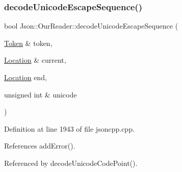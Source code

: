 \subsubsection{\texorpdfstring{decode\+Unicode\+Escape\+Sequence()}{decodeUnicodeEscapeSequence()}}
{\footnotesize\ttfamily bool Json\+::\+Our\+Reader\+::decode\+Unicode\+Escape\+Sequence (\begin{DoxyParamCaption}\item[{\hyperlink{class_json_1_1_our_reader_1_1_token}{Token} \&}]{token,  }\item[{\hyperlink{class_json_1_1_our_reader_a1bdc7bbc52ba87cae6b19746f2ee0189}{Location} \&}]{current,  }\item[{\hyperlink{class_json_1_1_our_reader_a1bdc7bbc52ba87cae6b19746f2ee0189}{Location}}]{end,  }\item[{unsigned int \&}]{unicode }\end{DoxyParamCaption})\hspace{0.3cm}{\ttfamily [private]}}



Definition at line 1943 of file jsoncpp.\+cpp.



References add\+Error().



Referenced by decode\+Unicode\+Code\+Point().


